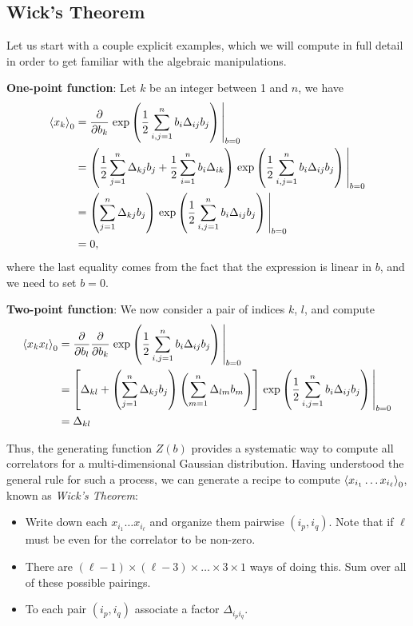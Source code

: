 \documentclass{article}
\numberwithin{equation}{section}
\begin{document}
\subsection{Wick's Theorem}

Let us start with a couple explicit examples, which we will compute in full detail in order to get familiar with the algebraic manipulations.

\textbf{One-point function}: Let $k$ be an integer between 1 and $n$, we have 
\begin{equation}
\begin{aligned}
    \ev{x_k}_0 &= \pdv{b_k} \eval{\exp\left(\frac{1}{2}\sum_{i,j = 1}^n b_i \Delta_{ij} b_j \right)}_{b=0} \\
    &= \left(\frac{1}{2}\sum_{j=1}^n \Delta_{kj}b_j + \frac{1}{2}\sum_{i=1}^n b_i \Delta_{ik} \right)\eval{\exp\left(\frac{1}{2}\sum_{i,j = 1}^n b_i \Delta_{ij} b_j \right)}_{b=0} \\
    &= \left(\sum_{j=1}^n \Delta_{kj}b_j\right)\eval{\exp\left(\frac{1}{2}\sum_{i,j = 1}^n b_i \Delta_{ij} b_j \right)}_{b=0} \\
    &= 0,
\end{aligned}
\end{equation}
where the last equality comes from the fact that the expression is linear in $b$, and we need to set $b=0$.

\textbf{Two-point function}: We now consider a pair of indices $k$, $l$, and compute
\begin{equation}
\begin{aligned}
    \ev{x_k x_l}_0 &= \pdv{b_l} \pdv{b_k} \eval{\exp\left(\frac{1}{2}\sum_{i,j = 1}^n b_i \Delta_{ij} b_j \right)}_{b=0} \\
    &= \left[\Delta_{kl} + \left(\sum_{j=1}^n \Delta_{kj} b_j \right) \left(\sum_{m=1}^n \Delta_{lm} b_m \right)\right] \eval{\exp\left(\frac{1}{2}\sum_{i,j = 1}^n b_i \Delta_{ij} b_j \right)}_{b=0} \\
    &= \Delta_{kl}
\end{aligned}
\end{equation}

Thus, the generating function $Z(b)$ provides a systematic way to compute all correlators for a multi-dimensional Gaussian distribution. Having understood the general rule for such a process, we can generate a recipe to compute $\ev{x_{i_1} \dots x_{i_\ell}}_0$, known as \textit{Wick's Theorem}:
\begin{itemize}
    \item Write down each $x_{i_1} \dots x_{i_\ell}$ and organize them pairwise $(i_p, i_q)$. Note that if $\ell$ must be even for the correlator to be non-zero.
    \item There are $(\ell - 1)\times(\ell-3) \times \dots \times 3 \times 1$ ways of doing this. Sum over all of these possible pairings.
    \item To each pair $(i_p, i_q)$ associate a factor $\Delta_{i_p i_q}$.
\end{itemize}
\end{document}
